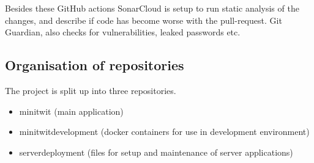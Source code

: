 Besides these GitHub actions SonarCloud is setup to run static analysis of the changes, and describe if code has become worse with the pull-request. Git Guardian, also checks for vulnerabilities, leaked passwords etc.




\subsection{Organisation of repositories}

The project is split up into three repositories.\cite{contributing.md}
\begin{itemize}
    \item minitwit (main application)
    \item minitwitdevelopment (docker containers for use in development environment)
    \item serverdeployment (files for setup and maintenance of server applications)
\end{itemize}


